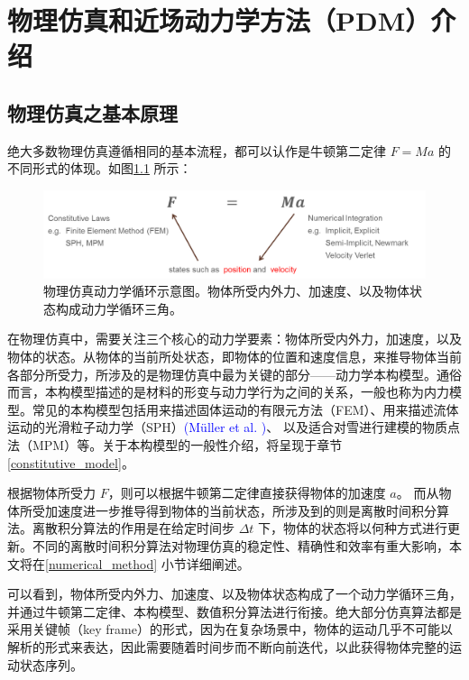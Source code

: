 ﻿\chapter{物理仿真和近场动力学方法（PDM）介绍}

\section{物理仿真之基本原理}
绝大多数物理仿真遵循相同的基本流程，都可以认作是牛顿第二定律 $F = Ma$ 的不同形式的体现。如图\ref{fig_physically_based_animation} 所示：
\begin{figure}[htbp!]
  \centering
  \captionsetup{justification=centering}
  \includegraphics[width=\linewidth]{chap/image/physically_based_animation}

  \caption{\label{fig_physically_based_animation}
           物理仿真动力学循环示意图。物体所受内外力、加速度、以及物体状态构成动力学循环三角。
          }
\end{figure}

在物理仿真中，需要关注三个核心的动力学要素：物体所受内外力，加速度，以及物体的状态。从物体的当前所处状态，即物体的位置和速度信息，来推导物体当前各部分所受力，所涉及的是物理仿真中最为关键的部分——动力学本构模型。通俗而言，本构模型描述的是材料的形变与动力学行为之间的关系，一般也称为内力模型。常见的本构模型包括用来描述固体运动的有限元方法（FEM）、用来描述流体运动的光滑粒子动力学（SPH）\textcolor{blue}{(M\"{u}ller et al. )\parencite{Muller2003}}、 以及适合对雪进行建模的物质点法（MPM）等。关于本构模型的一般性介绍，将呈现于章节\ref{constitutive_model}。

根据物体所受力 $F$，则可以根据牛顿第二定律直接获得物体的加速度 $a$。 而从物体所受加速度进一步推导得到物体的当前状态，所涉及到的则是离散时间积分算法。离散积分算法的作用是在给定时间步 $\Delta t$ 下，物体的状态将以何种方式进行更新。不同的离散时间积分算法对物理仿真的稳定性、精确性和效率有重大影响，本文将在\ref{numerical_method} 小节详细阐述。

可以看到，物体所受内外力、加速度、以及物体状态构成了一个动力学循环三角，并通过牛顿第二定律、本构模型、数值积分算法进行衔接。绝大部分仿真算法都是采用关键帧（key frame）的形式，因为在复杂场景中，物体的运动几乎不可能以解析的形式来表达，因此需要随着时间步而不断向前迭代，以此获得物体完整的运动状态序列。

